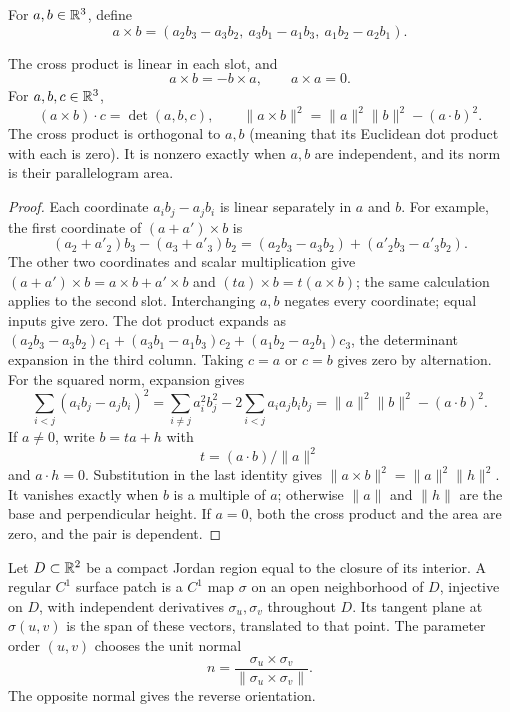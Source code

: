 \begin{definition}
For $a,b\in\mathbb{R}^3$, define
\[
a\times b=(a_2b_3-a_3b_2,\ a_3b_1-a_1b_3,\ a_1b_2-a_2b_1).
\]
\end{definition}
\begin{proposition}\label{prop:cross-product-identities}
The cross product is linear in each slot, and
\[
a\times b=-b\times a,\qquad a\times a=0.
\]
For $a,b,c\in\mathbb{R}^3$,
\[
(a\times b)\cdot c=\det(a,b,c),\qquad
\|a\times b\|^2=\|a\|^2\|b\|^2-(a\cdot b)^2.
\]
The cross product is orthogonal to $a,b$ (meaning that its Euclidean dot
product with each is zero). It is nonzero exactly when $a,b$ are independent,
and its norm is their parallelogram area.
\end{proposition}
\begin{proof}
Each coordinate $a_i b_j-a_j b_i$ is linear separately in $a$ and $b$.
For example, the first coordinate of $(a+a')\times b$ is
\[
(a_2+a'_2)b_3-(a_3+a'_3)b_2
=(a_2b_3-a_3b_2)+(a'_2b_3-a'_3b_2).
\]
The other two coordinates and scalar multiplication give
$(a+a')\times b=a\times b+a'\times b$ and
$(ta)\times b=t(a\times b)$; the same calculation applies to the second
slot. Interchanging $a,b$ negates every coordinate; equal inputs give zero.
The dot product expands as
$(a_2b_3-a_3b_2)c_1+(a_3b_1-a_1b_3)c_2+(a_1b_2-a_2b_1)c_3$,
the determinant expansion in the third column. Taking $c=a$ or $c=b$
gives zero by alternation. For the squared norm, expansion gives
\[
\sum_{i<j}(a_ib_j-a_jb_i)^2
=\sum_{i\ne j}a_i^2b_j^2-2\sum_{i<j}a_ia_jb_ib_j
=\|a\|^2\|b\|^2-(a\cdot b)^2.
\]
If $a\ne0$, write $b=ta+h$ with
\[
t=(a\cdot b)/\|a\|^2
\]
 and
$a\cdot h=0$. Substitution in the last identity gives
$\|a\times b\|^2=\|a\|^2\|h\|^2$. It vanishes exactly when $b$ is
a multiple of $a$; otherwise $\|a\|$ and $\|h\|$ are the base and
perpendicular height. If $a=0$, both the cross product and the area are zero,
and the pair is dependent.
\end{proof}
\begin{definition}
Let $D\subset\mathbb{R}^2$ be a compact Jordan region equal to the closure of its
interior. A regular $C^1$ surface patch is a $C^1$ map $\sigma$ on an open
neighborhood of $D$, injective on $D$, with independent derivatives
$\sigma_u,\sigma_v$ throughout $D$. Its tangent plane at $\sigma(u,v)$ is the
span of these vectors, translated to that point. The parameter order $(u,v)$
chooses the unit normal
\[
n=\frac{\sigma_u\times\sigma_v}{\|\sigma_u\times\sigma_v\|}.
\]
The opposite normal gives the reverse orientation.
\end{definition}

